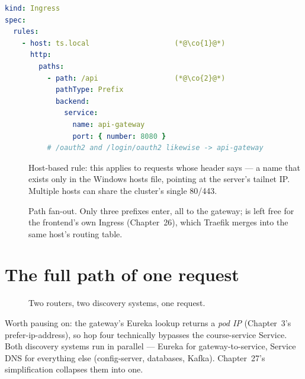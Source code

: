 \begin{lstlisting}[language=yaml]
kind: Ingress
spec:
  rules:
    - host: ts.local                    (*@\co{1}@*)
      http:
        paths:
          - path: /api                  (*@\co{2}@*)
            pathType: Prefix
            backend:
              service:
                name: api-gateway
                port: { number: 8080 }
          # /oauth2 and /login/oauth2 likewise -> api-gateway
\end{lstlisting}

\begin{description}
  \item[] Host-based rule: this applies to requests whose
   header says  --- a name that exists only in
  the Windows hosts file, pointing at the server's tailnet IP. Multiple
  hosts can share the cluster's single 80/443.
  \item[] Path fan-out. Only three prefixes enter, all to the
  gateway; \code{/} is left free for the frontend's own Ingress
  (Chapter~26), which Traefik merges into the same host's routing table.
\end{description}

\section{The full path of one request}

\begin{figure}[h]
\centering
{}
\caption{Two routers, two discovery systems, one request.}
\end{figure}

Worth pausing on: the gateway's Eureka lookup returns a \emph{pod IP}
(Chapter~3's prefer-ip-address), so hop four technically bypasses the
course-service Service. Both discovery systems run in parallel ---
Eureka for gateway-to-service, Service DNS for everything else
(config-server, databases, Kafka). Chapter~27's simplification
collapses them into one.

